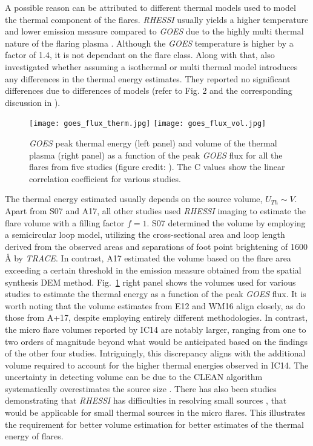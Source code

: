 A possible reason can be attributed to different thermal models used to model the thermal component of the flares. {\it RHESSI} usually yields a higher temperature and lower emission measure compared to {\it GOES} due to the highly multi thermal nature of the flaring plasma \citep{bataglia05,ryan14,warmuth16a}. Although the {\it GOES} temperature is higher by a factor of 1.4, it is not dependant on the flare class. Along with that, \cite{warmuth20} also investigated whether assuming a isothermal or multi thermal model introduces any differences in the thermal energy estimates. They reported no significant differences due to differences of models (refer to Fig. 2 and the corresponding discussion in \cite{warmuth20}).

\begin{figure}[ht!]
    \centering
    \texttt{[image: goes\_flux\_therm.jpg]}
    \texttt{[image: goes\_flux\_vol.jpg]}
    \caption{{\it GOES} peak thermal energy (left panel) and volume of the thermal plasma (right panel) as a function of the peak {\it GOES} flux for all the flares from five studies (figure credit: \cite{warmuth20}). The C values show the linear correlation coefficient for various studies.}
    \label{fig:goes-therm}
\end{figure}

The thermal energy estimated usually depends on the source volume, $U_{Th}\sim V$. Apart from S07 and A17, all other studies used {\it RHESSI} imaging to estimate the flare volume with a filling factor $f=1$. S07 determined the volume by employing a semicircular loop model, utilizing the cross-sectional area and loop length derived from the observed areas and separations of foot point brightening of 1600  {\AA} by {\it TRACE}. In contrast, A17 estimated the volume based on the flare area exceeding a certain threshold in the emission measure obtained from the spatial synthesis DEM method. Fig.~\ref{fig:goes-therm} right panel shows the volumes used for various studies to estimate the thermal energy as a function of the peak {\it GOES} flux. It is worth noting that the volume estimates from E12 and WM16 align closely, as do those from A+17, despite employing entirely different methodologies. In contrast, the micro flare volumes reported by IC14 are notably larger, ranging from one to two orders of magnitude beyond what would be anticipated based on the findings of the other four studies. Intriguingly, this discrepancy aligns with the additional volume required to account for the higher thermal energies observed in IC14. The uncertainty in detecting volume can be due to the CLEAN algorithm systematically overestimates the source size \citep{warmuth13a}. There has also been studies demonstrating that {\it RHESSI} has difficulties in resolving small sources \citep{dennis09,warmuth13b}, that would be applicable for small thermal sources in the micro flares. This illustrates the requirement for better volume estimation for better estimates of the thermal energy of flares.

